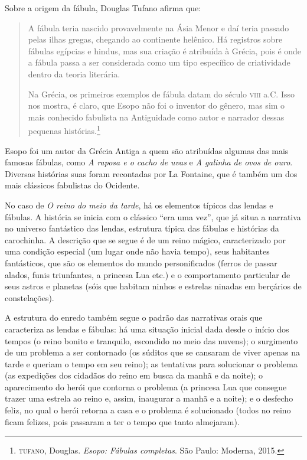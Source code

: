 \documentclass[11pt]{extarticle}
\begin{document}
Sobre a origem da fábula, Douglas Tufano afirma que:

\begin{quote}
A fábula teria nascido provavelmente na Ásia Menor e daí teria passado pelas ilhas gregas, chegando ao continente helênico. Há registros sobre fábulas egípcias e hindus, mas sua criação é atribuída à Grécia, pois é onde a fábula passa a ser considerada como um tipo específico de criatividade dentro da teoria literária. 

Na Grécia, os primeiros exemplos de fábula datam do século \textsc{viii} a.C. Isso nos mostra, é claro, que Esopo não foi o inventor do gênero, mas sim o mais conhecido fabulista na Antiguidade como autor e narrador dessas pequenas histórias.\footnote{\textsc{tufano}, Douglas. \textit{Esopo: Fábulas completas}. São Paulo: Moderna, 2015.}
\end{quote}

Esopo foi um autor da Grécia Antiga a quem são atribuídas algumas das mais famosas fábulas, como \textit{A raposa e o cacho de uvas} e \textit{A galinha de ovos de ouro}. Diversas  histórias suas foram recontadas por La Fontaine, que é também um dos mais clássicos fabulistas do Ocidente.

No caso de \textit{O reino do meio da tarde}, há os elementos típicos das lendas e fábulas.
A história se inicia com o clássico ``era uma vez'', que já situa a narrativa no universo fantástico das lendas, estrutura típica das fábulas e histórias da carochinha. A descrição que se segue é de um reino mágico, caracterizado por uma condição especial (um lugar onde não havia tempo), seus habitantes fantásticos, que são os elementos do mundo personificados (ferros de passar alados, funis triunfantes, a princesa Lua etc.) e o comportamento particular de seus astros e planetas (sóis que habitam ninhos e estrelas ninadas em berçários de constelações).

A estrutura do enredo também segue o padrão das narrativas orais que caracteriza as lendas e fábulas: há uma situação inicial dada desde o início dos tempos (o reino bonito e tranquilo, escondido no meio das nuvens); o surgimento de um problema a ser contornado (os súditos que se cansaram de viver apenas na tarde e queriam o tempo em seu reino); as tentativas para solucionar o problema (as expedições dos cidadãos do reino em busca da manhã e da noite); o aparecimento do herói que contorna o problema (a princesa Lua que consegue trazer uma estrela ao reino e, assim, inaugurar a manhã e a noite); e o desfecho feliz, no qual o herói retorna a casa e o problema é solucionado (todos no reino ficam felizes, pois passaram a ter o tempo que tanto almejaram).
\end{document}
